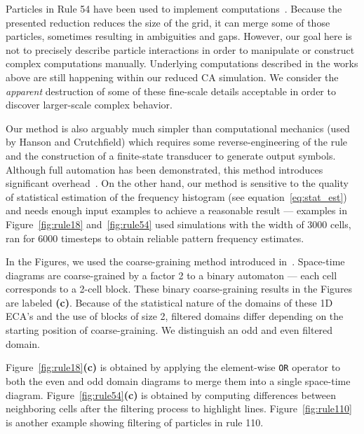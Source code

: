 Particles in Rule 54 have been used to implement
computations~\parencite{boccaraParticlelikeStructuresTheir1991,
  pivatoSpectralDomainBoundaries2007,
  martinezCompleteCharacterizationStructure2014}. Because the presented
reduction reduces the size of the grid, it can merge some of those particles,
sometimes resulting in ambiguities and gaps. However, our goal here is not to
precisely describe particle interactions in order to manipulate or construct
complex computations manually. Underlying computations described in the works
above are still happening within our reduced CA simulation. We consider the
\emph{apparent} destruction of some of these fine-scale details acceptable in
order to discover larger-scale complex behavior.

Our method is also arguably much simpler than computational mechanics (used by
Hanson and Crutchfield) which requires some reverse-engineering of the rule and
the construction of a finite-state transducer to generate output symbols.
Although full automation has been demonstrated, this method introduces
significant overhead~\parencite{rupeLocalCausalStates2018}. On the other hand, our
method is sensitive to the quality of statistical estimation of the frequency
histogram (see equation~\eqref{eq:stat_est}) and needs enough input examples to
achieve a reasonable result --- examples in Figure~\ref{fig:rule18}
and~\ref{fig:rule54} used simulations with the width of 3000 cells, ran for 6000
timesteps to obtain reliable pattern frequency estimates.

In the Figures, we used the coarse-graining method introduced
in~. Space-time diagrams are coarse-grained by a
factor 2 to a binary automaton --- each cell corresponds to a 2-cell block.
These binary coarse-graining results in the Figures are labeled \textbf{(c)}.
Because of the statistical nature of the domains of these 1D ECA's and the use of
blocks of size 2, filtered domains differ depending on the starting position of
coarse-graining. We distinguish an odd and even filtered domain.

Figure~\ref{fig:rule18}\textbf{(c)} is obtained by applying the element-wise
\texttt{OR} operator to both the even and odd domain diagrams to merge them into
a single space-time diagram. Figure~\ref{fig:rule54}\textbf{(c)} is obtained by
computing differences between neighboring cells after the filtering process to
highlight lines. Figure~\ref{fig:rule110} is another example showing filtering
of particles in rule 110.


